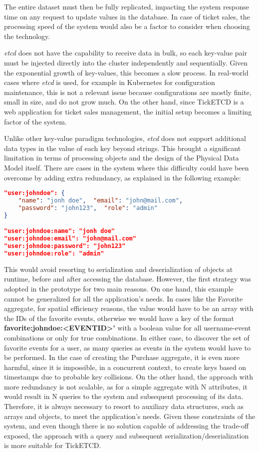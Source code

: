 \documentclass[screen,review]{acmart}
\begin{document}
The entire dataset must then be fully replicated, impacting the system response time on any request to update values in the database. In case of ticket sales, the processing speed of the system would also be a factor to consider when choosing the technology.

\textit{etcd} does not have the capability to receive data in bulk, so each key-value pair must be injected directly into the cluster independently and sequentially. Given the exponential growth of key-values, this becomes a slow process. In real-world cases where \textit{etcd} is used, for example in Kubernetes for configuration maintenance, this is not a relevant issue because configurations are mostly finite, small in size, and do not grow much. On the other hand, since TickETCD is a web application for ticket sales management, the initial setup becomes a limiting factor of the system.

Unlike other key-value paradigm technologies, \textit{etcd} does not support additional data types in the value of each key beyond strings. This brought a significant limitation in terms of processing objects and the design of the Physical Data Model itself. There are cases in the system where this difficulty could have been overcome by adding extra redundancy, as explained in the following example:

\begin{lstlisting}[language=json]
"user:johndoe": { 
    "name": "jonh doe",  "email": "john@mail.com", 
    "password": "john123",  "role": "admin"
}

"user:johndoe:name": "jonh doe"
"user:johndoe:email": "john@mail.com"
"user:johndoe:password": "john123"
"user:johndoe:role": "admin"
\end{lstlisting}

This would avoid resorting to serialization and deserialization of objects at runtime, before and after accessing the database. However, the first strategy was adopted in the prototype for two main reasons. On one hand, this example cannot be generalized for all the application's needs. In cases like the Favorite aggregate, for spatial efficiency reasons, the value would have to be an array with the IDs of the favorite events, otherwise we would have a key of the format \textbf{favorite:johndoe:<EVENTID>'} with a boolean value for all username-event combinations or only for true combinations. In either case, to discover the set of favorite events for a user, as many queries as events in the system would have to be performed. In the case of creating the Purchase aggregate, it is even more harmful, since it is impossible, in a concurrent context, to create keys based on timestamps due to probable key collisions. On the other hand, the approach with more redundancy is not scalable, as for a simple aggregate with N attributes, it would result in N queries to the system and subsequent processing of its data. Therefore, it is always necessary to resort to auxiliary data structures, such as arrays and objects, to meet the application's needs. Given these constraints of the system, and even though there is no solution capable of addressing the trade-off exposed, the approach with a query and subsequent serialization/deserialization is more suitable for TickETCD.
\end{document}
